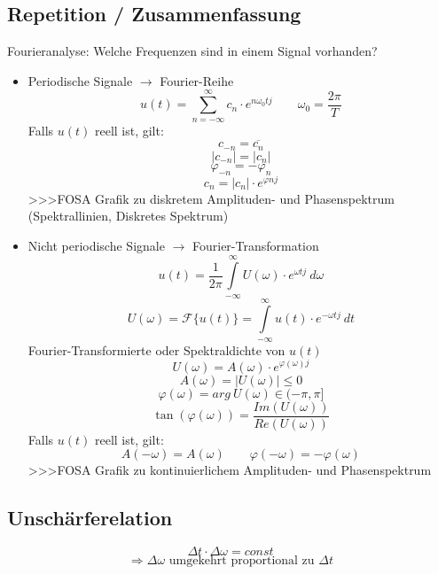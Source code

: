 \subsection{Repetition / Zusammenfassung}
Fourieranalyse: Welche Frequenzen sind in einem Signal vorhanden? 
\begin{itemize}
  \item Periodische Signale $\to$ Fourier-Reihe
        \[ u(t) = \sum\limits_{n = -\infty}^{\infty} c_n \cdot e^{n \omega_0 t j} 
        \qquad \omega_0 = \frac{2 \pi}{T} \]
        Falls $u(t)$ reell ist, gilt: 
        \[ c_{-n} = \overline{c_n} \]
        \[ |c_{-n}| = |c_n| \]
        \[ \varphi_{-n} = - \varphi_n \]
        \[ c_n = |c_n| \cdot e^{\varphi n j} \]
        >>>FOSA Grafik zu diskretem Amplituden- und Phasenspektrum
                (Spektrallinien, Diskretes Spektrum)
  \item Nicht periodische Signale $\to$ Fourier-Transformation
        \[ u(t) = \frac{1}{2 \pi} \int\limits_{-\infty}^{\infty} U(\omega) 
        \cdot e^{\omega t j} ~ d\omega \]
        \[ U(\omega) = \mathcal{F}\{ u(t) \} =  \int\limits_{-\infty}^{\infty} 
        u(t) \cdot e^{-\omega t j} ~ dt \]
        Fourier-Transformierte oder Spektraldichte von $u(t)$
        \[ U(\omega) = A(\omega) \cdot e^{\varphi(\omega) j} \]
        \[ A(\omega) = |U(\omega)| \leq 0 \]
        \[ \varphi(\omega) = arg ~ U(\omega) \in (-\pi , \pi \rbrack \]
        \[ \tan(\varphi(\omega)) = \frac{Im(U(\omega))}{Re(U(\omega))} \]
        Falls $u(t)$ reell ist, gilt: 
        \[ A(-\omega) = A(\omega) \qquad \varphi(-\omega) = -\varphi(\omega) \]
        >>>FOSA Grafik zu kontinuierlichem Amplituden- und Phasenspektrum
\end{itemize}

\subsection{Unschärferelation}
\[ \Delta t \cdot \Delta \omega = const \]
\[ \Rightarrow \Delta \omega \text{ umgekehrt proportional zu } \Delta t \]
